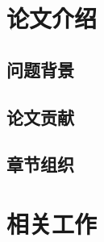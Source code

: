 \documentclass[a4paper,twoside,AutoFakeBold]{article}
\theoremstyle{definition}
\begin{document}

\maketitle
\thispagestyle{empty} \cleardoublepage

\rptcontent \thispagestyle{empty} \cleardoublepage

\begin{abstract}\kaiti \xiaosi
\end{abstract}
\cleardoublepage

\songti\xiaosi
%
\section{论文介绍}
\subsection{问题背景}
\cite{zhangzhihua2021quasinewton1}

\subsection{论文贡献}

\subsection{章节组织}

%
\section{相关工作}\label{section:related}
\end{document}
